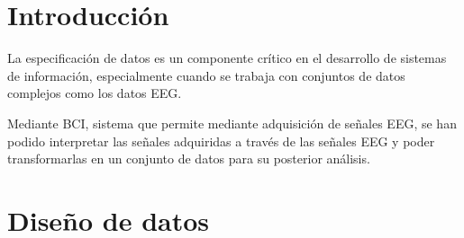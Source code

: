 
\section{Introducción}

La especificación de datos es un componente crítico en el desarrollo de sistemas de información, especialmente cuando se trabaja con conjuntos de datos complejos como los datos EEG. 

Mediante BCI, sistema que permite mediante adquisición de señales EEG, se han podido interpretar las señales adquiridas a través de las señales EEG y poder transformarlas en un conjunto de datos para su posterior análisis.  


\section{Diseño de datos}

